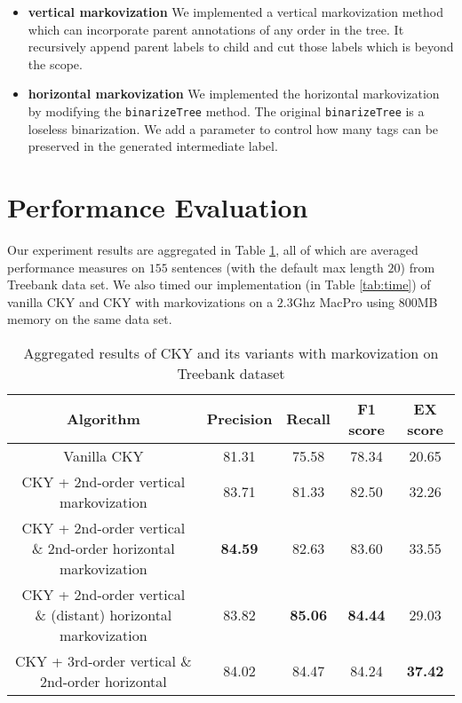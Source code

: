 \documentclass[letterpaper]{article}
\begin{document}
\begin{itemize}
\item \textbf{vertical markovization}
We implemented a vertical markovization method which can incorporate parent annotations of any order in the tree. It recursively append parent labels to child and cut those labels which is beyond the scope. 
\item \textbf{horizontal markovization}
We implemented the horizontal markovization by modifying the \texttt{binarizeTree} method. The original \texttt{binarizeTree} is a loseless binarization. We add a parameter to control how many tags can be preserved in the generated intermediate label.
\end{itemize}


\section{Performance Evaluation}
Our experiment results are aggregated in Table \ref{tab:prec}, all of which are averaged performance measures on $155$ sentences (with the default max length $20$) from Treebank data set. We also timed our implementation (in Table \ref{tab:time}) of vanilla CKY and CKY with markovizations on a $2.3$Ghz MacPro using $800$MB memory on the same data set.
\begin{table}
\begin{center}
\begin{tabular}{|c|c|c|c|c|}
\hline
Algorithm & Precision & Recall & F1 score & EX score \\
\hline
Vanilla CKY & 81.31 & 75.58   & 78.34  & 20.65 \\
\hline
CKY + 2nd-order vertical markovization &
83.71 & 81.33  & 82.50  & 32.26 \\
\hline
CKY + 2nd-order vertical \& 2nd-order horizontal markovization &
\textbf{84.59}  & 82.63  & 83.60  & 33.55 \\
\hline
CKY + 2nd-order vertical \& (distant) horizontal markovization &
83.82 & \textbf{85.06 } & \textbf{84.44}  & 29.03 \\
\hline
CKY + 3rd-order vertical \& 2nd-order horizontal &
84.02 & 84.47  & 84.24  & \textbf{37.42} \\
\hline
\end{tabular}
\caption{Aggregated results of CKY and its variants with markovization on Treebank dataset}\label{tab:prec}
\end{center}
\end{table}
\end{document}
